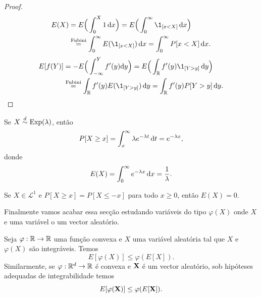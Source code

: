 \begin{proof}
  \begin{equation}
    \begin{split}
      E(X) & = E \Big( \int_0^X 1 \d x \Big) = E \Big( \int_0^\infty \1_{[x < X]} \d x \Big)\\
      & \overset{\text{Fubini}}= \int_0^\infty E(\1_{[x < X]}) \d x = \int_0^\infty P[x < X] \d x.
    \end{split}
  \end{equation}
    \begin{equation}
    \begin{split}
      E[f(Y)] & = - E \Big( \int_{-\infty}^Y f'(y)  \dd y \Big) = E \Big( \int_\bbR f'(y) \1_{[Y>y]} \d y \Big)\\
      & \overset{\text{Fubini}}= \int_\bbR f'(y) E(\1_{[Y>y]}) \d y = \int_\bbR f'(y) P[Y>y] \d y.
    \end{split}
  \end{equation}
\end{proof}

\begin{example}
  Se $X \overset{d}\sim \operatorname{Exp}(\lambda)$, então
  \begin{equation}
    P[X \geq x] = \int_x^\infty \lambda e^{-\lambda t} \mathop{}\!\mathrm{d} t = e^{-\lambda x},
  \end{equation}
  donde
  \begin{equation}
    E(X) = \int_0^\infty e^{-\lambda x} \mathop{}\!\mathrm{d} x = \frac{1}{\lambda}.
  \end{equation}
\end{example}

\begin{exercise}
  Se $X \in \mathcal{L}^1$ e $P[X \geq x] = P[X \leq -x]$ para todo $x \geq 0$, então $E(X) = 0$.
\end{exercise}


Finalmente vamos acabar essa secção estudando variáveis  do tipo $\varphi(X)$ onde $X$ e uma variável o um vector aleatório.

\begin{proposition}
  Seja $\varphi:{\mathbb R} \to {\ensuremath{\mathbb R}}$ uma função convexa e $X$ uma variável  aleatória tal que $X$ e $\varphi(X)$ são integráveis.
  Temos
  \begin{equation}
    E[ \varphi(X) ] \le \varphi(E[X]).
  \end{equation}
  Similarmente, se $\varphi: {\mathbb R}^d \to {\ensuremath{\mathbb R}}$ é convexa e ${\bf X}$ é um vector aleatório, sob hipóteses adequadas de integrabilidade temos
  \begin{equation}
    E[ \varphi({\bf X}) ] \le \varphi(E[{\bf X}]).
  \end{equation}
\end{proposition}

